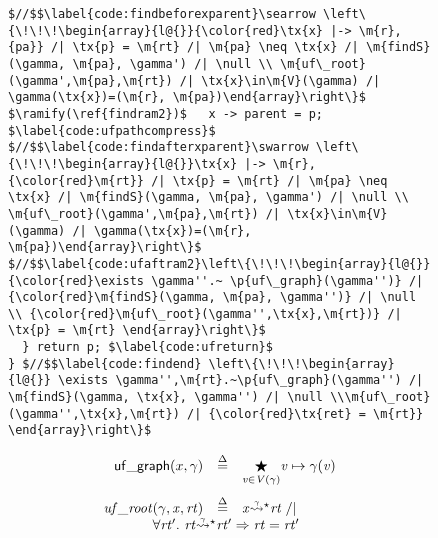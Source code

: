 \documentclass[acmsmall,review,anonymous]{acmart}\settopmatter{printfolios=true,printccs=false,printacmref=false}
\newcommand{\defeq}{\mathbin{\stackrel{\Delta}{=}}}
\newcommand{\tx}[1]{\text{#1}}
\newcommand{\p}[1]{\ensuremath{\mathsf{#1}}} \newcommand{\m}[1]{\ensuremath{\mathit{#1}}} \newcommand{\ma}[1]{\ensuremath{\mathcal{#1}}} \let\ramify\lightning
\begin{document}
\begin{figure}[t]
\begin{lstlisting}[multicols=2]
$//$$\label{code:findbeforexparent}\searrow \left\{\!\!\!\begin{array}{l@{}}{\color{red}\tx{x} |-> \m{r},{pa}} /| \tx{p} = \m{rt} /| \m{pa} \neq \tx{x} /| \m{findS}(\gamma, \m{pa}, \gamma') /| \null \\ \m{uf\_root}(\gamma',\m{pa},\m{rt}) /| \tx{x}\in\m{V}(\gamma) /| \gamma(\tx{x})=(\m{r}, \m{pa})\end{array}\right\}$
$\ramify(\ref{findram2})$   x -> parent = p; $\label{code:ufpathcompress}$
$//$$\label{code:findafterxparent}\swarrow \left\{\!\!\!\begin{array}{l@{}}\tx{x} |-> \m{r},{\color{red}\m{rt}} /| \tx{p} = \m{rt} /| \m{pa} \neq \tx{x} /| \m{findS}(\gamma, \m{pa}, \gamma') /| \null \\ \m{uf\_root}(\gamma',\m{pa},\m{rt}) /| \tx{x}\in\m{V}(\gamma) /| \gamma(\tx{x})=(\m{r}, \m{pa})\end{array}\right\}$
$//$$\label{code:ufaftram2}\left\{\!\!\!\begin{array}{l@{}} {\color{red}\exists \gamma''.~ \p{uf\_graph}(\gamma'')} /| {\color{red}\m{findS}(\gamma, \m{pa}, \gamma'')} /| \null \\ {\color{red}\m{uf\_root}(\gamma'',\tx{x},\m{rt})} /| \tx{p} = \m{rt} \end{array}\right\}$
  } return p; $\label{code:ufreturn}$
} $//$$\label{code:findend} \left\{\!\!\!\begin{array}{l@{}} \exists \gamma'',\m{rt}.~\p{uf\_graph}(\gamma'') /| \m{findS}(\gamma, \tx{x}, \gamma'') /| \null \\\m{uf\_root}(\gamma'',\tx{x},\m{rt}) /| {\color{red}\tx{ret} = \m{rt}}  \end{array}\right\}$
\end{lstlisting}
\vspace*{-1ex}
{\footnotesize
\begin{flushleft}
\begin{minipage}[c]{0.46\textwidth}
\vspace*{-1ex}
\begin{equation*}
\label{eqn:ufgraphdefn}
\begin{array}{@{}l@{}lcl@{}}
\multicolumn{2}{r}{\p{uf\_graph}(x, \gamma)} & \defeq & \underset{\m{v} \in \m{V}(\gamma)}{\bigstar} \m{v}	\mapsto\gamma(\m{v}) \\
[15pt]
\m{uf\_root}&(\gamma,\m{x},\m{rt}) & \defeq & \m{x} \accentset{\gamma}{\leadsto}^{\star} \m{rt} \; /| \null \\  
& \multicolumn{3}{@{}l}{\forall \m{rt'}.~\m{rt} \accentset{\gamma}{\leadsto}^{\star} \m{rt'} => \m{rt} = \m{rt'}}

\end{array}
\end{equation*}
\end{minipage}
\end{flushleft}}
\end{figure}
\end{document}
